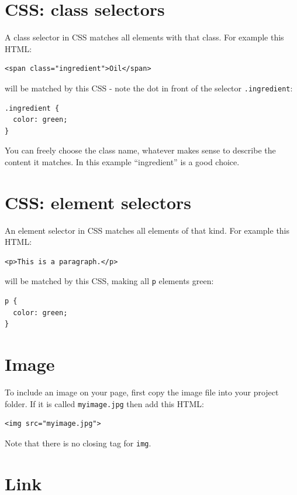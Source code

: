 \documentclass[10pt,a4paper]{article}
\begin{document}
\section*{CSS: class selectors }

A class selector in CSS matches all elements with that class. For
example this HTML:

\begin{lstlisting}
<span class="ingredient">Oil</span>
\end{lstlisting}

will be matched by this CSS - note the dot in front of the selector
\lstinline|.ingredient|:

\begin{lstlisting}
.ingredient {
  color: green;
}
\end{lstlisting}

You can freely choose the class name, whatever makes sense to describe
the content it matches. In this example ``ingredient'' is a good choice.

\section*{CSS: element selectors}

An element selector in CSS matches all elements of that kind. For
example this HTML:

\begin{lstlisting}
<p>This is a paragraph.</p>
\end{lstlisting}

will be matched by this CSS, making all \lstinline|p| elements green:

\begin{lstlisting}
p {
  color: green;
}
\end{lstlisting}

\section*{Image}

To include an image on your page, first copy the image file into your
project folder. If it is called \lstinline|myimage.jpg| then add this
HTML:

\begin{lstlisting}
<img src="myimage.jpg">
\end{lstlisting}

Note that there is no closing tag for \lstinline|img|.

\section*{Link}
\end{document}
